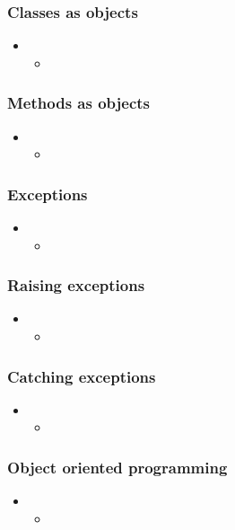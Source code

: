 \begin{frame}[fragile]
%
  \frametitle{Classes as objects}
%
  \begin{itemize}
%
  \item 
    \begin{itemize}
    \item
    \end{itemize}
%
  \end{itemize}
%
\end{frame}

\begin{frame}[fragile]
%
  \frametitle{Methods as objects}
%
  \begin{itemize}
%
  \item 
    \begin{itemize}
    \item
    \end{itemize}
%
  \end{itemize}
%
\end{frame}

\begin{frame}[fragile]
%
  \frametitle{Exceptions}
%
  \begin{itemize}
%
  \item 
    \begin{itemize}
    \item
    \end{itemize}
%
  \end{itemize}
%
\end{frame}

\begin{frame}[fragile]
%
  \frametitle{Raising exceptions}
%
  \begin{itemize}
%
  \item 
    \begin{itemize}
    \item
    \end{itemize}
%
  \end{itemize}
%
\end{frame}

\begin{frame}[fragile]
%
  \frametitle{Catching exceptions}
%
  \begin{itemize}
%
  \item 
    \begin{itemize}
    \item
    \end{itemize}
%
  \end{itemize}
%
\end{frame}

\begin{frame}[fragile]
%
  \frametitle{Object oriented programming}
%
  \begin{itemize}
%
  \item 
    \begin{itemize}
    \item
    \end{itemize}
%
  \end{itemize}
%
\end{frame}

